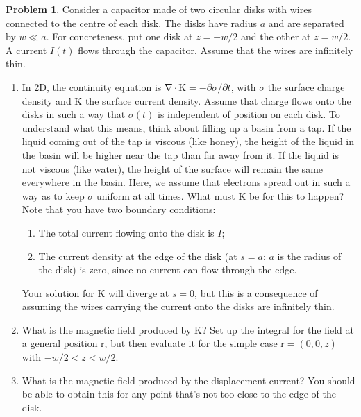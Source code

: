 \documentclass[10pt]{article}
\theoremstyle{definition}
\newtheorem{problem}{Problem}
\renewcommand{\div}[1]{\bv{\nabla}\cdot #1}
\newcommand{\bv}[1]{\bm{\mathrm{#1}}}
\begin{document}
\begin{problem}
Consider a capacitor made of two circular disks with wires connected to the centre of each
disk. The disks have radius $a$ and are separated by $w \ll a$. For concreteness, put one disk
at $z = -w/2$ and the other at $z=w/2$. A current $I(t)$ flows through the capacitor. Assume
that the wires are infinitely thin.
\begin{enumerate}[label=(\alph*)]
  \item In 2D, the continuity equation is $\div{\bv{K}}=-\partial\sigma/\partial t$, with $\sigma$ the surface charge density
        and $\bv{K}$ the surface current density. Assume that charge flows onto the disks in such a
        way that $\sigma(t)$ is independent of position on each disk. To understand what this means,
        think about filling up a basin from a tap. If the liquid coming out of the tap is viscous
        (like honey), the height of the liquid in the basin will be higher near the tap than far
        away from it. If the liquid is not viscous (like water), the height of the surface will
        remain the same everywhere in the basin. Here, we assume that electrons spread out
        in such a way as to keep $\sigma$ uniform at all times. What must $\bv{K}$ be for this to happen?
        Note that you have two boundary conditions:
        \begin{enumerate}[label=(\roman*)]
          \item The total current flowing onto the disk is $I$;
          \item The current density at the edge of the disk (at $s = a$; $a$ is the radius of the disk)
                is zero, since no current can flow through the edge.
        \end{enumerate}
        Your solution for $\bv{K}$ will diverge at $s = 0$, but this is a consequence of assuming the
        wires carrying the current onto the disks are infinitely thin.
  \item What is the magnetic field produced by $\bv{K}$? Set up the integral for the field at a general
        position $\bv{r}$, but then evaluate it for the simple case $\bv{r}=(0,0,z)$ with $-w/2<z<w/2$.
  \item What is the magnetic field produced by the displacement current? You should be able
        to obtain this for any point that's not too close to the edge of the disk.
\end{enumerate}
\end{problem}
\end{document}
